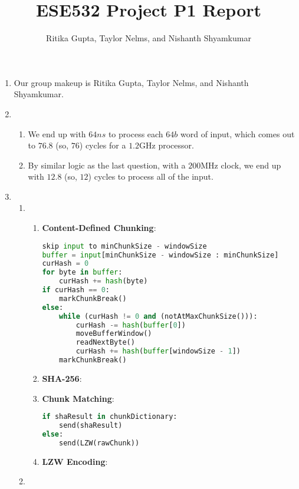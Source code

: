 \documentclass{article}
\title{ESE532 Project P1 Report}
\author{Ritika Gupta, Taylor Nelms, and Nishanth Shyamkumar}
\begin{document}
\maketitle


\begin{enumerate}
\item%
Our group makeup is Ritika Gupta, Taylor Nelms, and Nishanth Shyamkumar.

\item%
\begin{enumerate}[label=(\alph*)]
\item%
We end up with $64ns$ to process each $64b$ word of input, which comes out to $76.8$ (so, $76$) cycles for a $1.2$GHz processor.

\item%
By similar logic as the last question, with a $200$MHz clock, we end up with $12.8$ (so, $12$) cycles to process all of the input.

\end{enumerate}%

\item%
\begin{enumerate}[label=(\alph*)]
\item%
\begin{enumerate}[label=(\roman*)]
\item%
\textbf{Content-Defined Chunking}:\newline
\begin{lstlisting}[language=python]
skip input to minChunkSize - windowSize
buffer = input[minChunkSize - windowSize : minChunkSize]
curHash = 0
for byte in buffer:
    curHash += hash(byte)
if curHash == 0:
    markChunkBreak()
else:
    while (curHash != 0 and (notAtMaxChunkSize())):
        curHash -= hash(buffer[0])
        moveBufferWindow()
        readNextByte()
        curHash += hash(buffer[windowSize - 1])
    markChunkBreak()
\end{lstlisting}
\item%
\textbf{SHA-256}:
\item%
\textbf{Chunk Matching}:
\begin{lstlisting}[language=python]
if shaResult in chunkDictionary:
    send(shaResult)
else:
    send(LZW(rawChunk))
\end{lstlisting}
\item%
\textbf{LZW Encoding}:

\end{enumerate}%
\item%


\end{enumerate}
\end{enumerate}
\end{document}
